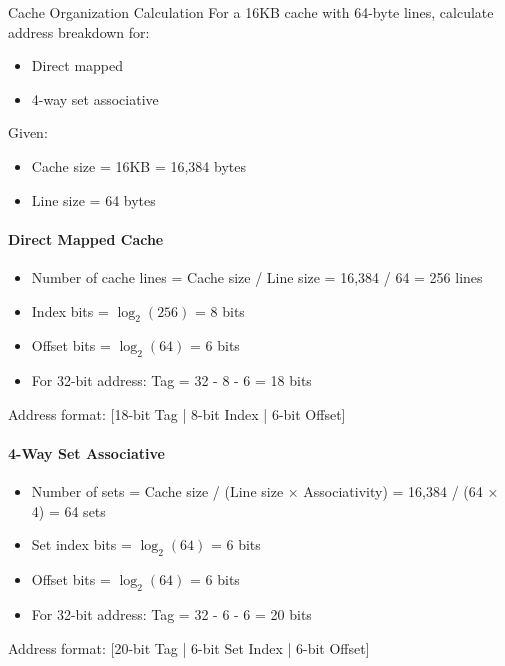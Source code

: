 \begin{example2}{Cache Organization Calculation}
For a 16KB cache with 64-byte lines, calculate address breakdown for:
\begin{itemize}
\item Direct mapped
\item 4-way set associative
\end{itemize}
\tcblower
Given:
\begin{itemize}
    \item Cache size = 16KB = 16,384 bytes
    \item Line size = 64 bytes
\end{itemize}

\paragraph{Direct Mapped Cache}
\begin{itemize}
    \item Number of cache lines = Cache size / Line size = 16,384 / 64 = 256 lines
    \item Index bits = $\log_2(256)$ = 8 bits
    \item Offset bits = $\log_2(64)$ = 6 bits
    \item For 32-bit address: Tag = 32 - 8 - 6 = 18 bits
\end{itemize}
Address format: [18-bit Tag | 8-bit Index | 6-bit Offset]
\paragraph{4-Way Set Associative}
\begin{itemize}
    \item Number of sets = Cache size / (Line size × Associativity) = 16,384 / (64 × 4) = 64 sets
    \item Set index bits = $\log_2(64)$ = 6 bits
    \item Offset bits = $\log_2(64)$ = 6 bits
    \item For 32-bit address: Tag = 32 - 6 - 6 = 20 bits
\end{itemize}   
Address format: [20-bit Tag | 6-bit Set Index | 6-bit Offset]
\end{example2}

